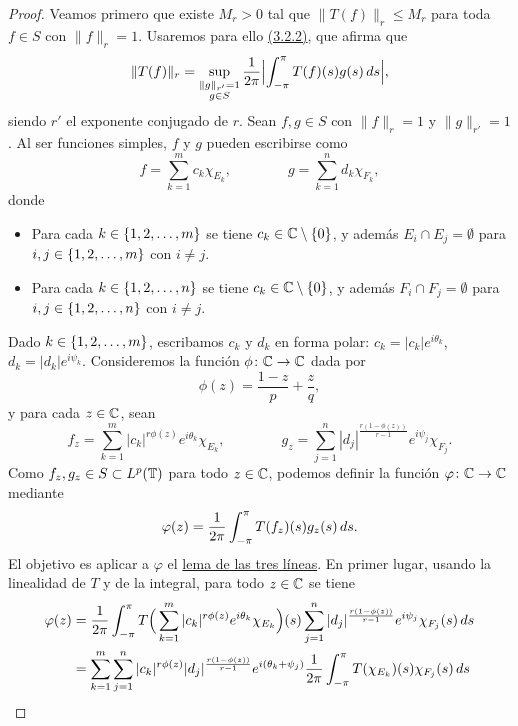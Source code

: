 \documentclass[a4paper, 12pt, oneside]{book}
\begin{document}
\begin{proof}
    Veamos primero que existe $M_r>0$ tal que $\|T(f)\|_r \leq M_r$ para toda $f \in S$ con $\|f\|_r = 1$. Usaremos para ello \hyperref[3.2.2]{\color{blue}(3.2.2)}, que afirma que
    \begin{equation}\label{3.2.6}
        \|T(f)\|_r = \sup_{\substack{\|g\|_{r'}=1 \\ g \in S}}\frac{1}{2\pi}\Bigl|\integral[s]{-\pi}{\pi}{T(f)(s)g(s)}\Bigr|,
    \end{equation}
    siendo $r'$ el exponente conjugado de $r$. Sean $f,g \in S$ con $\|f\|_r = 1$ y $\|g\|_{r'} = 1$. Al ser funciones simples, $f$ y $g$ pueden escribirse como
    \[f = \sum_{k=1}^m c_k\chi_{E_k}, \qquad \qquad g = \sum_{k=1}^n d_k \chi_{F_k},\]
    donde
    \begin{itemize}
        \item Para cada $k \in\{1,2,\mathellipsis,m\}$ se tiene $c_k \in \C\setminus \{0\}$, y además $E_i \cap E_j = \emptyset$ para $i,j\in\{1,2,\mathellipsis,m\}$ con $i\neq j$.
        \item Para cada $k \in\{1,2,\mathellipsis,n\}$ se tiene $c_k \in \C\setminus \{0\}$, y además $F_i \cap F_j = \emptyset$ para $i,j\in\{1,2,\mathellipsis,n\}$ con $i\neq j$.
    \end{itemize}
    Dado $k\in \{1,2,\mathellipsis,m\}$, escribamos $c_k$ y $d_k$ en forma polar: $c_k = |c_k|e^{i\theta_k}$, $d_k = |d_k|e^{i\psi_k}$. Consideremos la función $\phi \colon \C \to \C$ dada por
    \[\phi(z) = \frac{1-z}{p}+\frac{z}{q},\]
    y para cada $z \in \C$, sean
    \[f_z = \sum_{k=1}^m |c_k|^{r\phi(z)}e^{i\theta_k}\chi_{E_k}, \qquad \qquad g_z =  \sum_{j=1}^n |d_j|^{\frac{r(1-\phi(z))}{r-1}}e^{i\psi_j}\chi_{F_j}.\]
    Como $f_z,g_z \in S \subset L^p(\T)$ para todo $z \in \C$, podemos definir la función $\varphi \colon \C \to \C$ mediante
    \[\varphi(z) = \frac{1}{2\pi}\integral[s]{-\pi}{\pi}{T(f_z)(s)g_z(s)}.\]
    El objetivo es aplicar a $\varphi$ el \hyperref[3.2.3]{\color{blue}lema de las tres líneas}. En primer lugar, usando la linealidad de $T$ y de la integral, para todo $z\in\C$ se tiene
    \begin{align}\label{3.2.7}
        \varphi(z) &= \frac{1}{2\pi}\integral[s]{-\pi}{\pi}{T\Bigl(\,\sum_{k=1}^m |c_k|^{r\phi(z)}e^{i\theta_k}\chi_{E_k}\Bigr)(s)\sum_{j=1}^n |d_j|^{\frac{r(1-\phi(z))}{r-1}}e^{i\psi_j}\chi_{F_j}(s)} \notag \\
        &= \sum_{k=1}^m \sum_{j=1}^n |c_k|^{r\phi(z)}|d_j|^{\frac{r(1-\phi(z))}{r-1}}e^{i(\theta_k+\psi_j)}\frac{1}{2\pi}\integral[s]{-\pi}{\pi}{T(\chi_{E_k})(s)\chi_{F_j}(s)} \notag \\

\end{align}
\end{proof}
\end{document}
